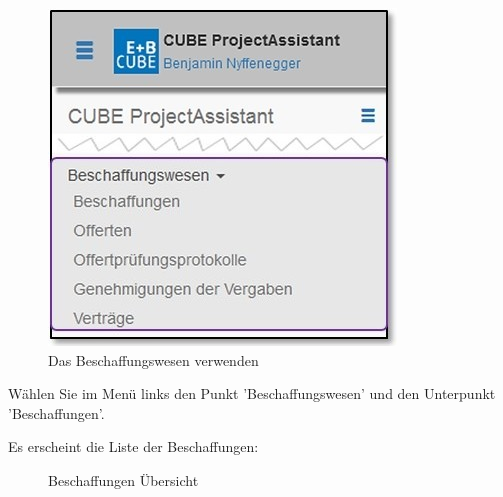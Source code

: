 \begin{figure}   %
  \vspace{-35pt}      %
  \begin{center}
    \includegraphics[width=1\linewidth]{../chapters/08_Beschaffungswesen/pictures/7-1-2_Menu_Beschaffungswesen.jpg}
  \end{center}
  \vspace{-20pt}
  \caption{Das Beschaffungswesen verwenden}
  \vspace{-10pt}
\end{figure}

Wählen Sie im Menü links den Punkt 'Beschaffungswesen' und den Unterpunkt 'Beschaffungen'. 

\vspace{10cm}

Es erscheint die Liste der Beschaffungen:

\begin{figure}[H]
\caption{Beschaffungen Übersicht}
\end{figure}

